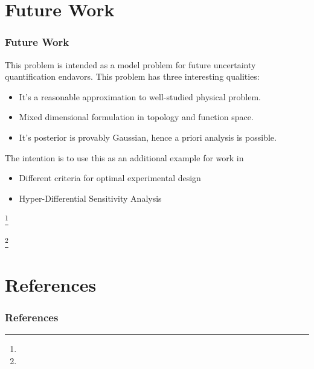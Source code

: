 \documentclass[
  pdf,
  10pt,
  xcolor={svgnames},
]{beamer}
\newcommand\blfootnote[1]{%
  \begingroup
  \renewcommand\thefootnote{}\footnote{\scriptsize #1}%
  \addtocounter{footnote}{-1}%
  \endgroup
}
\begin{document}
\section{Future Work}
\begin{frame}
  \frametitle{Future Work}
  This problem is intended as a model problem for future uncertainty
  quantification endavors. This problem has three interesting qualities:
  \begin{itemize}
    \item It's a reasonable approximation to well-studied physical problem.
    \item Mixed dimensional formulation in topology and function space.
    \item It's posterior is provably Gaussian, hence a priori analysis is
      possible.
  \end{itemize}
  The intention is to use this as an additional example for work in
  \begin{itemize}
    \item Different criteria for optimal experimental design
    \item Hyper-Differential Sensitivity Analysis
  \end{itemize}
  \blfootnote{}
  \blfootnote{}
\end{frame}


\section{References}
\begin{frame}[allowframebreaks]
  \frametitle{References}
  \printbibliography
\end{frame}
\end{document}

